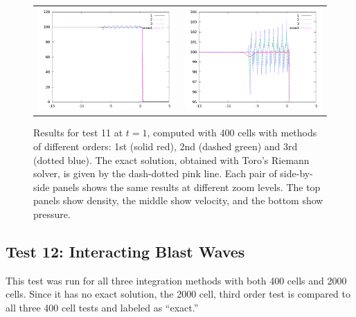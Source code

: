 \documentclass[10pt]{article}
\begin{document}
\begin{figure}[h]
\begin{center}
\begin{tabular}{cc}
      \includegraphics[width=.4\textwidth]{prs_T11.png} &	
      \includegraphics[width=.4\textwidth]{prs11zoom.png} \\
	\end{tabular}	
  \end{center}
  \caption{Results for test 11 at $t=1$, computed with 400 cells with methods of different orders: 1st (solid red), 2nd (dashed green) and 3rd (dotted blue). The exact solution, obtained with Toro's Riemann solver, is given by the dash-dotted pink line. Each pair of side-by-side panels shows the same results at different zoom levels. The top panels show density, the middle show velocity, and the bottom show pressure.}
\end{figure}

\clearpage

\subsection{Test 12: Interacting Blast Waves}
This test was run for all three integration methods with both 400 cells and 2000 cells. Since it has no exact solution, the 2000 cell, third order test is compared to all three 400 cell tests and labeled as ``exact.''
\end{document}
